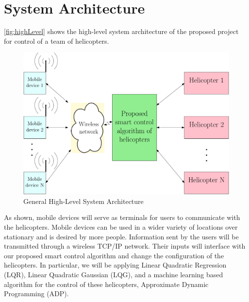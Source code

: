 \documentclass[12pt]{article} %
\begin{document}
\section{System Architecture}
%
\autoref{fig:highLevel} shows the high-level system architecture of the proposed project for control of a team of helicopters.  %
%
\begin{figure}
  \centering
  \begin{mdframed}[backgroundcolor=yellow!20, roundcorner=7pt,outerlinewidth=1.2pt,outerlinecolor=blue!50]
  \includegraphics[scale=0.749]{figs/ipe/highLevel_yel_grn}
  \end{mdframed}
  \caption{General High-Level System Architecture}
  \label{fig:highLevel}
\end{figure}
%
As shown, mobile devices will serve as terminals for users to communicate with the helicopters.  Mobile devices can be used in a wider variety of locations over stationary and is desired by more people.  Information sent by the users will be transmitted through a wireless TCP/IP network.  Their inputs will interface with our proposed smart control algorithm and change the configuration of the helicopters.  In particular, we will be applying Linear Quadratic Regression (LQR), Linear Quadratic Gaussian (LQG), and a machine learning based algorithm for the control of these helicopters, Approximate Dynamic Programming (ADP).  

\end{document}

